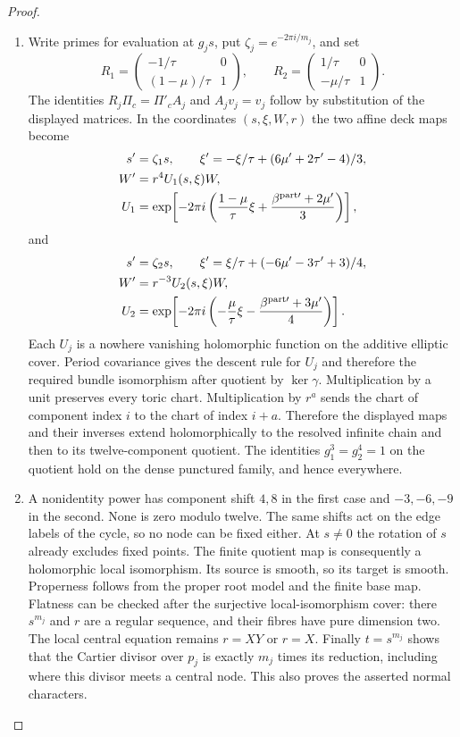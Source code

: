 \begin{proof}
\begin{enumerate}[label=\arabic*.,leftmargin=*]
\item Write primes for
evaluation at $g_js$, put $\zeta_j=e^{-2\pi i/m_j}$,
and set
\[
 R_1=\begin{pmatrix}-1/\tau&0\\(1-\mu)/\tau&1\end{pmatrix},
 \qquad
 R_2=\begin{pmatrix}1/\tau&0\\-\mu/\tau&1\end{pmatrix}.
\]
The identities $R_j\Pi_c=\Pi'_c A_j$ and $A_jv_j=v_j$
follow by substitution of the displayed matrices. In the coordinates
$(s,\xi,W,r)$ the two affine deck maps become
\begin{align*}
 s'&=\zeta_1s,\qquad
 \xi'=-\xi/\tau+(6\mu'+2\tau'-4)/3,\\
 W'&=r^4 U_1(s,\xi)W,\\
 U_1&=\exp\!\left[-2\pi i
  \left(\frac{1-\mu}{\tau}\xi+
        \frac{\beta^{{\rm part}\prime}+2\mu'}3\right)\right],
 \end{align*}
and
\begin{align*}
 s'&=\zeta_2s,\qquad
 \xi'=\xi/\tau+(-6\mu'-3\tau'+3)/4,\\
 W'&=r^{-3} U_2(s,\xi)W,\\
 U_2&=\exp\!\left[-2\pi i
  \left(-\frac{\mu}{\tau}\xi-
        \frac{\beta^{{\rm part}\prime}+3\mu'}4\right)\right].
 \end{align*}
Each $U_j$ is a nowhere vanishing holomorphic function on
the additive elliptic cover. Period covariance gives the descent rule for $U_j$ and
therefore the required bundle isomorphism after quotient
by $\ker\gamma$. Multiplication by a unit preserves every toric chart.
Multiplication by $r^a$ sends the chart of component index
$i$ to the chart of index $i+a$. Therefore the displayed
maps and their inverses extend holomorphically to the
resolved infinite chain and then to its twelve-component
quotient. The identities $g_1^3=g_2^4=1$ on the quotient
hold on the dense punctured family, and hence everywhere.

\item A nonidentity power has component shift $4,8$ in the first
case and $-3,-6,-9$ in the second. None is zero modulo
twelve. The same shifts act on the edge labels of the
cycle, so no node can be fixed either. At $s\ne0$ the
rotation of $s$ already excludes fixed points. The finite
quotient map is consequently a holomorphic local
isomorphism. Its source is smooth, so its target is smooth.
Properness follows from the proper root model and the
finite base map. Flatness can be checked after the
surjective local-isomorphism cover: there $s^{m_j}$ and
$r$ are a regular sequence, and their fibres have pure
dimension two. The local central equation remains
$r=XY$ or $r=X$. Finally $t=s^{m_j}$ shows that the
Cartier divisor over $p_j$ is exactly $m_j$ times its
reduction, including where this divisor meets a central
node. This also proves the asserted normal characters.


\end{enumerate}
\end{proof}
